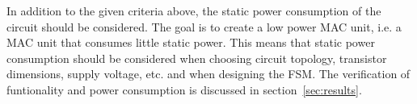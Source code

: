 In addition to the given criteria above, the static power consumption of the circuit should be considered. The goal is to create a low power MAC unit, i.e. a MAC unit that consumes little static power. This means that static power consumption should be considered when choosing circuit topology, transistor dimensions, supply voltage, etc. and when designing the FSM. The verification of funtionality and power consumption is discussed in section~\ref{sec:results}.